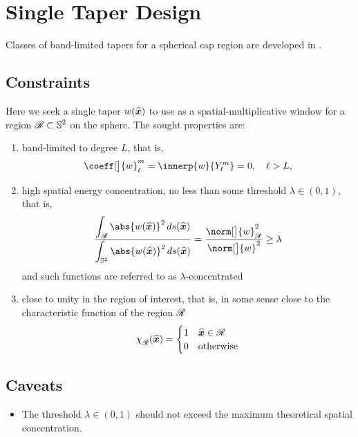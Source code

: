 \documentclass[10pt, twocolumn, twoside]{IEEEtran}
\newcommand{\untsph}{\mathbb{S}^{2}} %
\newcommand{\unit}[1]{\widehat{\bm{#1}}}
\begin{document}
\IEEEpeerreviewmaketitle



\section{Single Taper Design}

\begin{bibunit}


Classes of band-limited tapers for a spherical cap region are developed in \cite{Wieczorek:2005}.

\subsection{Constraints}

Here we seek a single taper $\taper(\unit{x})$ to use as a spatial-multiplicative window for a region $\R\subset\untsph$ on the sphere.  The sought properties are:
\begin{enumerate}
\item band-limited to degree $L$, that is,
\[
\coeff[\big]{\taper}_{\ell}^{m} = \innerp{\taper}{Y_{\ell}^{m}} = 0,\quad \ell>L,
\]
\item high spatial energy concentration, no less than some threshold $\lambda\in(0,1)$, that is,
\[
\frac{\displaystyle\int_{\R} \abs{\taper(\unit{x})}^2\,ds(\unit{x})}
{\displaystyle\int_{\untsph} \abs{\taper(\unit{x})}^2\,ds(\unit{x})} =
\frac{\norm[\big]{\taper}_{\R}^2}
{\norm[\big]{\taper}^2}
\geq \lambda
\]
and such functions are referred to as $\lambda$-concentrated

\item close to unity in the region of interest, that is, in some sense close to the characteristic function of the region $\mathscr{R}$
\[
\chfn(\unit{x}) =
\begin{cases}
1 & \unit{x}\in\R \\
0 & \text{otherwise}%
\end{cases}
\]
\end{enumerate}

\subsection{Caveats}

\begin{itemize}
\item
The threshold $\lambda\in(0,1)$ should not exceed the maximum theoretical spatial concentration. 


\end{itemize}
\end{bibunit}
\end{document}
